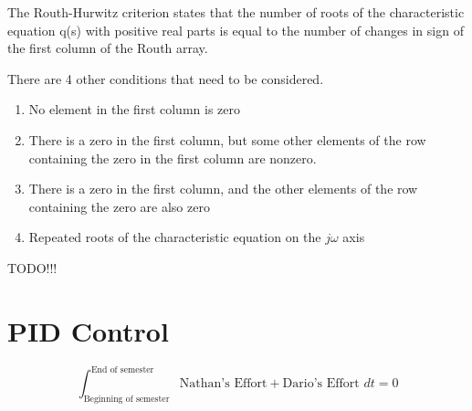 \documentclass{article}
\begin{document}
    The Routh-Hurwitz criterion states that the number of roots of the characteristic equation q(s) with 
    positive real parts is equal to the number of changes in sign of the first column of the Routh array.

    There are 4 other conditions that need to be considered.
    \begin{enumerate}
        \item No element in the first column is zero
        \item There is a zero in the first column, but some other elements of the row containing the zero in the 
              first column are nonzero.
        \item There is a zero in the first column, and the other elements of the row containing the zero are also zero
        \item Repeated roots of the characteristic equation on the $j\omega$ axis
    \end{enumerate}

    TODO!!!
    
    \section*{PID Control}




\begin{equation*}
    \int_{\text{Beginning of semester}}^{\text{End of semester}} \text{Nathan's Effort} + \text{Dario's Effort} \,\, dt = 0
\end{equation*}
\end{document}
